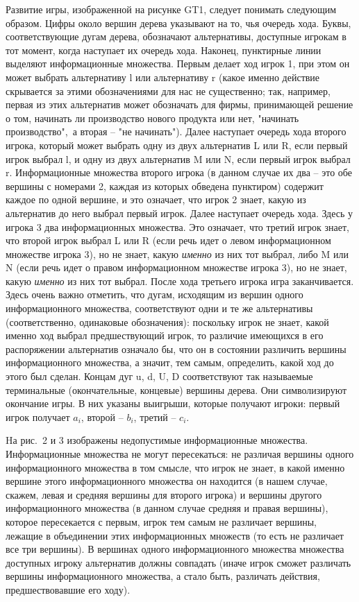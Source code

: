 Развитие игры, изображенной на рисунке GT1, следует понимать следующим
образом. Цифры около вершин дерева указывают на то, чья очередь хода.
Буквы, соответствующие дугам дерева, обозначают альтернативы, доступные
игрокам в тот момент, когда наступает их очередь хода. Наконец,
пунктирные линии выделяют информационные множества. Первым делает ход
игрок 1, при этом он может выбрать альтернативу
l или альтернативу r (какое именно действие скрывается за этими обозначениями
для нас не существенно; так, например, первая из этих альтернатив может
обозначать для фирмы, принимающей решение о том, начинать ли производство
нового продукта или нет, "начинать производство",\, а вторая -- "не начинать").
Далее наступает очередь хода второго игрока, который может выбрать
одну из двух альтернатив L или R, если первый игрок выбрал l, и одну из двух
альтернатив M или N, если первый игрок выбрал r. Информационные множества
второго игрока (в данном случае их два -- это обе вершины с номерами 2,
каждая из которых обведена пунктиром) содержит каждое по одной вершине,
и это означает, что игрок 2 знает, какую из альтернатив до него выбрал
первый игрок. Далее наступает очередь хода. Здесь у игрока 3 два
информационных множества. Это означает, что третий игрок знает, что второй
игрок выбрал L или R (если речь идет о левом информационном множестве
игрока 3), но не знает, какую \emph{именно} из них тот выбрал, либо M или
N (если речь идет о правом информационном множестве
игрока 3), но не знает, какую \emph{именно} из них тот выбрал. После хода
третьего игрока игра заканчивается. Здесь очень важно отметить, что
дугам, исходящим из вершин одного информационного множества, соответствуют
одни и те же альтернативы (соответственно, одинаковые обозначения):
поскольку игрок не знает, какой именно ход выбрал предшествующий игрок, то
различие имеющихся в его распоряжении альтернатив означало бы, что он
в состоянии различить вершины информационного множества, а значит, тем самым,
определить, какой ход до этого был сделан. Концам дуг u, d, U, D соответствуют
так называемые терминальные (окончательные, концевые) вершины дерева.
Они символизируют окончание игры. В них указаны выигрыши, которые получают
игроки: первый игрок получает $a_i$, второй -- $b_i$, третий -- $c_i$.


Hа рис.~2 и 3 изображены недопустимые информационные множества.
Информационные множества не могут пересекаться: не различая вершины
одного информационного множества в том смысле, что игрок не знает,
в какой именно вершине этого информационного множества он находится
(в нашем случае, скажем, левая и средняя вершины для второго игрока)
и вершины другого информационного множества
(в данном случае средняя и правая вершины), которое пересекается с первым,
игрок тем самым не различает вершины, лежащие в объединении этих информационных
множеств (то есть не различает все три вершины). В вершинах одного
информационного множества множества
доступных игроку альтернатив должны совпадать (иначе игрок сможет
различать вершины информационного множества, а стало быть, различать
действия, предшествовавшие его ходу).


